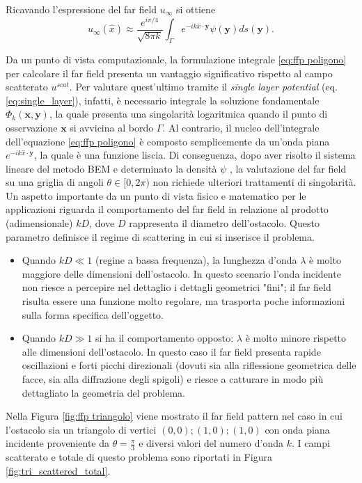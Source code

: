 \documentclass[a4paper,12pt]{article}
\theoremstyle{definition}
\begin{document}
Ricavando l'espressione del far field $u_\infty$ si ottiene
\begin{equation}
	\label{eq:ffp poligono}
	u_\infty(\hat{x}) \approx \frac{e^{i\pi/4}}{\sqrt{8\pi k }}\int_\Gamma e^{-ik \hat{x}\cdot \textbf{y}}\psi(\textbf{y}) ds(\textbf{y}).
\end{equation}

Da un punto di vista computazionale, la formulazione integrale \ref{eq:ffp poligono} per calcolare il far field presenta un vantaggio significativo rispetto al campo scatterato $u^{scat}$. Per valutare quest'ultimo tramite il \textit{single layer potential} (eq. \ref{eq:single_layer}), infatti, è necessario integrale la soluzione fondamentale $\Phi_k(\textbf{x}, \textbf{y})$, la quale presenta una singolarità logaritmica quando il punto di osservazione $\textbf{x}$ si avvicina al bordo $\Gamma$. Al contrario, il nucleo dell'integrale dell'equazione \ref{eq:ffp poligono} è composto semplicemente da un'onda piana $e^{-ik\hat{x}\cdot \textbf{y}}$, la quale è una funzione liscia. Di conseguenza, dopo aver risolto il sistema lineare del metodo BEM e determinato la densità $\psi$ , la valutazione del far field su una griglia di angoli $\theta \in [0, 2\pi)$ non richiede ulteriori trattamenti di singolarità. \\

Un aspetto importante da un punto di vista fisico e matematico per le applicazioni riguarda il comportamento del far field in relazione al prodotto (adimensionale) $kD$, dove $D$ rappresenta il diametro dell'ostacolo. Questo parametro definisce il regime di scattering in cui si inserisce il problema.
\begin{itemize}
	\item Quando $kD \ll 1$ (regine a bassa frequenza), la lunghezza d'onda $\lambda$ è molto maggiore delle dimensioni dell'ostacolo. In questo scenario l'onda incidente non riesce a percepire nel dettaglio i dettagli geometrici "fini"; il far field risulta essere una funzione molto regolare, ma trasporta poche informazioni sulla forma specifica dell'oggetto.
	\item Quando $kD \gg 1$ si ha il comportamento opposto: $\lambda$ è molto minore rispetto alle dimensioni dell'ostacolo. In questo caso il far field presenta rapide oscillazioni e forti picchi direzionali (dovuti sia alla riflessione geometrica delle facce, sia alla diffrazione degli spigoli) e riesce a catturare in modo più dettagliato la geometria del problema.
\end{itemize}  
Nella Figura \ref{fig:ffp triangolo} viene mostrato il far field pattern nel caso in cui l'ostacolo sia un triangolo di vertici $(0, 0); (1, 0); (1, 0)$ con onda piana incidente proveniente da $\theta = \frac{\pi}{3}$ e diversi valori del numero d'onda $k$. I campi scatterato e totale di questo problema sono riportati in Figura \ref{fig:tri_scattered_total}. 
\end{document}

